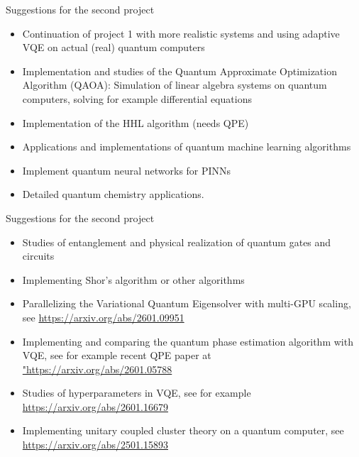 \documentclass{beamer}
\begin{document}
\begin{frame}{Suggestions for the second project}
\begin{itemize}
\item Continuation of project 1 with  more realistic systems and using adaptive VQE on actual (real) quantum computers
\item Implementation and studies of the Quantum Approximate Optimization Algorithm (QAOA): Simulation of linear algebra systems on quantum computers, solving for example differential equations
\item Implementation of the HHL algorithm (needs QPE)
\item Applications and implementations of quantum machine learning algorithms
\item Implement quantum neural networks for PINNs
\item Detailed quantum chemistry applications.
\end{itemize}
\end{frame}



\begin{frame}{Suggestions for the second project}
\begin{itemize}
\item Studies of entanglement and physical realization of quantum gates and circuits
\item Implementing Shor's algorithm or other algorithms
\item Parallelizing the Variational Quantum Eigensolver with multi-GPU scaling, see \url{https://arxiv.org/abs/2601.09951}
\item Implementing and comparing the quantum phase estimation algorithm with VQE, see for example recent QPE paper at \url{"https://arxiv.org/abs/2601.05788}
\item Studies of hyperparameters in VQE, see for example \url{https://arxiv.org/abs/2601.16679}
\item Implementing unitary coupled cluster theory on a quantum computer, see \url{https://arxiv.org/abs/2501.15893}
\end{itemize}
\end{frame}
\end{document}
